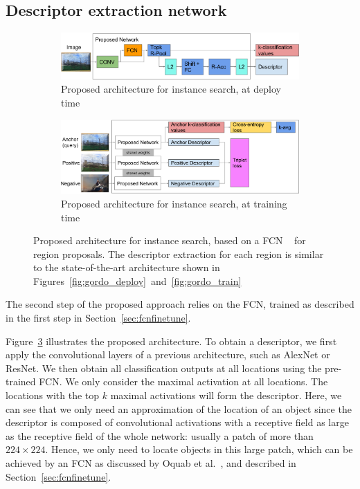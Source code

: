\subsection{Descriptor extraction network}
\begin{figure}
\begin{subfigure}{\textwidth}
\includegraphics[width=\textwidth]{img/contrib_deploy.png}
\caption{Proposed architecture for instance search, at deploy time
\label{fig:contribdeploy}}
\end{subfigure}

\begin{subfigure}{\textwidth}
\includegraphics[width=\textwidth]{img/contrib_train.png}
\caption{Proposed architecture for instance search, at training time
\label{fig:contribtrain}}
\end{subfigure}
\caption{Proposed architecture for instance search, based on a FCN
~\cite{long_fully_2015} for region proposals. The descriptor extraction
for each region is similar to the state-of-the-art architecture
shown in Figures~\ref{fig:gordo_deploy}~and~\ref{fig:gordo_train}
\label{fig:contrib}}
\end{figure}

The second step of the proposed approach relies on the FCN, trained
as described in the first step in Section~\ref{sec:fcnfinetune}.

Figure~\ref{fig:contrib} illustrates the proposed architecture.
To obtain a descriptor, we first apply the convolutional layers of
a previous architecture, such as AlexNet or ResNet. We then obtain all
classification outputs at all locations using the pre-trained FCN.
We only consider the maximal activation at all locations.
The locations with the top $k$ maximal activations will form the descriptor.
Here, we can see that we only need an approximation of the location of
an object since the descriptor is composed of convolutional activations with a
receptive field as large as the receptive field of the whole network: usually
a patch of more than $224 \times 224$. Hence, we only need to locate objects
in this large patch, which can be achieved by an FCN as discussed by Oquab
et al.~\cite{oquab_is_2015}, and described in Section~\ref{sec:fcnfinetune}.

